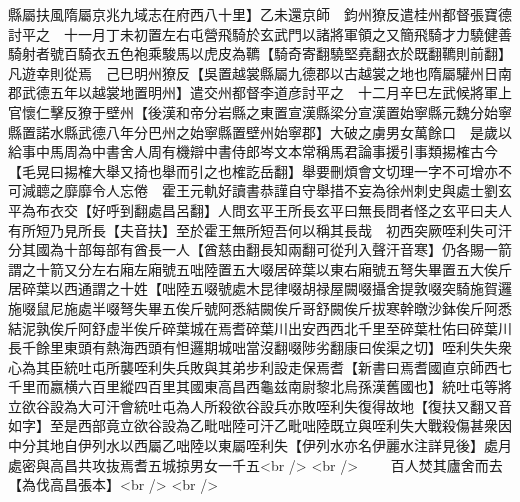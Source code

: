 縣屬扶風隋屬京兆九域志在府西八十里】乙未還京師　鈞州獠反遣桂州都督張寶德討平之　十一月丁未初置左右屯營飛騎於玄武門以諸將軍領之又簡飛騎才力驍健善騎射者號百騎衣五色袍乘駿馬以虎皮為韀【騎奇寄翻驍堅堯翻衣於既翻韀則前翻】凡遊幸則從焉　己巳明州獠反【吳置越裳縣屬九德郡以古越裳之地也隋屬驩州日南郡武德五年以越裳地置明州】遣交州都督李道彦討平之　十二月辛巳左武候將軍上官懷仁擊反獠于壁州【後漢和帝分岩縣之東置宣漢縣梁分宣漢置始寧縣元魏分始寧縣置諾水縣武德八年分巴州之始寧縣置壁州始寧郡】大破之虜男女萬餘口　是歲以給事中馬周為中書舍人周有機辯中書侍郎岑文本常稱馬君論事援引事類掦榷古今【毛晃曰掦榷大舉又掎也舉而引之也榷訖岳翻】舉要刪煩會文切理一字不可增亦不可減聼之靡靡令人忘倦　霍王元軌好讀書恭謹自守舉措不妄為徐州刺史與處士劉玄平為布衣交【好呼到翻處昌呂翻】人問玄平王所長玄平曰無長問者怪之玄平曰夫人有所短乃見所長【夫音扶】至於霍王無所短吾何以稱其長哉　初西突厥咥利失可汗分其國為十部每部有酋長一人【酋慈由翻長知兩翻可從刋入聲汗音寒】仍各賜一箭謂之十箭又分左右廂左廂號五咄陸置五大啜居碎葉以東右廂號五弩失畢置五大俟斤居碎葉以西通謂之十姓【咄陸五啜號處木昆律啜胡禄屋闕啜攝舍提敦啜突騎施賀邏施啜鼠尼施處半啜弩失畢五俟斤號阿悉結闕俟斤哥舒闕俟斤拔寒幹暾沙鉢俟斤阿悉結泥孰俟斤阿舒虚半俟斤碎葉城在焉耆碎葉川出安西西北千里至碎葉杜佑曰碎葉川長千餘里東頭有熱海西頭有怛邏期城咄當沒翻啜陟劣翻康曰俟渠之切】咥利失失衆心為其臣統吐屯所襲咥利失兵敗與其弟步利設走保焉耆【新書曰焉耆國直京師西七千里而嬴横六百里縱四百里其國東高昌西龜兹南尉黎北烏孫漢舊國也】統吐屯等將立欲谷設為大可汗會統吐屯為人所殺欲谷設兵亦敗咥利失復得故地【復扶又翻又音如字】至是西部竟立欲谷設為乙毗咄陸可汗乙毗咄陸既立與咥利失大戰殺傷甚衆因中分其地自伊列水以西屬乙咄陸以東屬咥利失【伊列水亦名伊麗水注詳見後】處月處密與高昌共攻抜焉耆五城掠男女一千五<br />
<br />
　　百人焚其廬舍而去【為伐高昌張本】<br />
<br />
